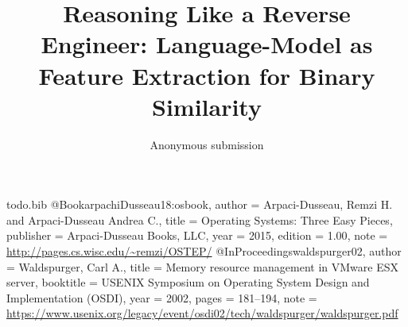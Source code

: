 \usepackage{filecontents}

\begin{filecontents}{todo.bib}
@Book{arpachiDusseau18:osbook,
  author =       {Arpaci-Dusseau, Remzi H. and Arpaci-Dusseau Andrea C.},
  title =        {Operating Systems: Three Easy Pieces},
  publisher =    {Arpaci-Dusseau Books, LLC},
  year =         2015,
  edition =      {1.00},
  note =         {\url{http://pages.cs.wisc.edu/~remzi/OSTEP/}}
}
@InProceedings{waldspurger02,
  author =       {Waldspurger, Carl A.},
  title =        {Memory resource management in {VMware ESX} server},
  booktitle =    {USENIX Symposium on Operating System Design and
                  Implementation (OSDI)},
  year =         2002,
  pages =        {181--194},
  note =         {\url{https://www.usenix.org/legacy/event/osdi02/tech/waldspurger/waldspurger.pdf}}}
\end{filecontents}

\usepackage[most]{tcolorbox}



\date{}

\title{\Large \bf Reasoning Like a Reverse Engineer: Language-Model as Feature Extraction for Binary Similarity }

\author{
{\rm Anonymous submission}
} 


\maketitle


